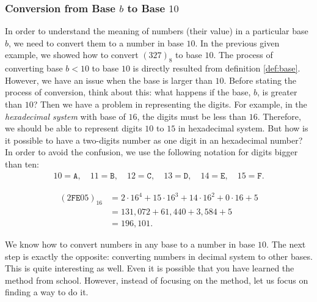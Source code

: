 \documentclass{subfile}
\begin{document}
	\subsubsection{Conversion from Base $b$ to Base $10$}
	In order to understand the meaning of numbers (their value) in a particular base $b$, we need to convert them to a number in base $10$. In the previous given example, we showed how to convert $(327)_8$ to base $10$. The process of converting base $b<10$ to base $10$ is directly resulted from definition \eqref{def:base}. However, we have an issue when the base is larger than $10$. Before stating the process of conversion, think about this: what happens if the base, $b$, is greater than $10$? Then we have a problem in representing the digits. For example, in the \textit{hexadecimal system} with base of $16$, the digits must be less than $16$. Therefore, we should be able to represent digits $10$ to $15$ in hexadecimal system. But how is it possible to have a two-digits number as one digit in an hexadecimal number? In order to avoid the confusion, we use the following notation for digits bigger than ten:
	\begin{align*}
		10 = \mathtt{A}, \quad 11 = \mathtt{B}, \quad 12 = \mathtt{C}, \quad 13 = \mathtt{D}, \quad 14 = \mathtt{E}, \quad 15 = \mathtt{F}.
	\end{align*}

	\begin{example}
		\begin{align*}
			(2\mathtt{F}\mathtt{E}05)_{16} & = 2 \cdot 16^4 + 15 \cdot 16^3 + 14 \cdot 16^2 + 0 \cdot 16 + 5 \\
			& = 131,072 + 61,440 + 3,584 + 5\\
			& = 196,101.
		\end{align*}
	\end{example}
	We know how to convert numbers in any base to a number in base $10$. The next step is exactly the opposite: converting numbers in decimal system to other bases. This is quite interesting as well. Even it is possible that you have learned the method from school. However, instead of focusing on the method, let us focus on finding a way to do it.
\end{document}
